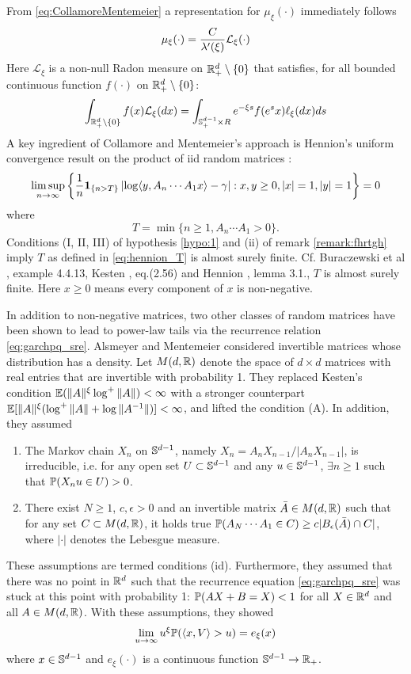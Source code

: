 From \eqref{eq:CollamoreMentemeier} a representation for
$\mu_\xi (\cdot)$ immediately follows 
\[
\mu_\xi (\cdot) = {C \over \lambda'(\xi)} \mathcal L_\xi(\cdot)
\]
Here $\mathcal L_\xi$ is a non-null Radon measure  on
$\reals^d_+ \setminus \{0\}$ that satisfies, for all
bounded continuous function $f(\cdot)$ on
$\reals_+^{d} \setminus \{0\}$:
\[
\int_{\reals_+^d\setminus \{0\}} f(x) \mathcal L_\xi(dx)
=
\int_{\sphere^{d-1}_+ \times R} e^{-\xi s} f(e^s x) \ell_\xi(dx) ds
\]
A key ingredient of Collamore and Mentemeier's approach is Hennion's
uniform convergence result on the product of iid random matrices
\cite{hennion:1997}:
\[
\limsup_{n \to \infty}
\left\{
  {1 \over n} \1{n > T}
  \left|
  \log \inn{y, A_n \cdots A_1 x} - \gamma
  \right|
  :
  x, y \geq 0, |x| = 1, |y| = 1
  \right\} = 0
\]
where
\begin{equation}
  \label{eq:hennion_T}
  T = \min\{n \geq 1, A_n \cdots A_1 > 0\}.
\end{equation}
Conditions (I, II, III) of hypothesis \ref{hypo:1} and (ii) of remark
\ref{remark:fhrtgh} imply $T$ as defined in \eqref{eq:hennion_T} is
almost surely finite. Cf. Buraczewski et al
\cite{buraczewski:damek:mikosch:2016}, example 
  4.4.13, Kesten \cite{kesten:1973}, eq.(2.56) and Hennion
  \cite{hennion:1997}, lemma 3.1., $T$ is almost surely finite.
Here $x \geq 0$ means every component of $x$ is non-negative.

In addition to non-negative matrices, two other classes of random
matrices have been shown to lead to power-law tails via the recurrence
relation \eqref{eq:garchpq_sre}. Alsmeyer and Mentemeier
\cite{alsmeyer:mentemeier:2012} considered invertible matrices whose
distribution has a density. Let $M(d, \reals)$ denote the space of
$d \times d$ matrices with real entries that are invertible with
probability 1. They replaced Kesten's condition
$\E (\|A\|^\xi \log^+\|A\|) < \infty$ with a stronger
counterpart
$\E [\|A\|^\xi (\log^+\|A\| + \log \|A^{-1} \|)] < \infty$,
and lifted the condition (A). In addition, they assumed
\begin{enumerate}
  \item The Markov chain $X_n$ on $\sphere^{d-1}$, namely
    $X_n = A_n X_{n-1} / |A_n X_{n-1}|$, is irreducible, i.e. for any open
    set $U \subset \sphere^{d-1}$ and any $u \in \sphere^{d-1}$, 
    $\exists n \geq 1$ such that $\P(X_n u \in U) > 0$.
  \item There exist $N \geq 1$, $c, \epsilon > 0$ and an invertible
    matrix $\bar A \in M(d, \reals)$ such that for any set
    $C \subset M(d, \reals)$, it holds true
    $\P(A_N \cdots A_1 \in C) \geq c |B_\epsilon(\bar A) \cap C|$,
    where $|\cdot|$ denotes the Lebesgue measure.
\end{enumerate}
These assumptions are termed conditions (id). Furthermore, they assumed
that there was no point in $\reals^d$ such that the recurrence
equation \eqref{eq:garchpq_sre} was stuck at this point with probability 1: 
$\P(A X + B = X) < 1$ for all $X \in \reals^d$ and all $A \in M(d, \reals)$.
With these assumptions, they showed
\[
\lim_{u \to \infty} u^\xi \P(\inn{x, V} > u) = e_\xi(x)
\]
where $x \in \sphere^{d - 1}$ and $e_\xi(\cdot)$ is a continuous
function $\sphere^{d-1} \to \reals_+$.

